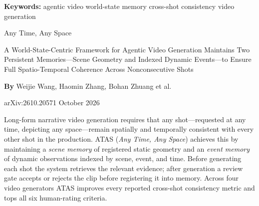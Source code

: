 \documentclass[10pt,twocolumn]{article}
\begin{document}
\setlength{\parindent}{0pt}
\setlength{\parskip}{4pt}

{\small\color{keywordgray}\textbf{Keywords:}
  agentic video \textbullet{}
  world-state memory \textbullet{}
  cross-shot consistency \textbullet{}
  video generation}\par\vspace{4pt}

{\LARGE\bfseries\raggedright
  Any Time, Any Space}\par\vspace{4pt}

{\large\itshape\raggedright
  A World-State-Centric Framework for Agentic Video Generation Maintains
  Two Persistent Memories---Scene Geometry and Indexed Dynamic Events---to
  Ensure Full Spatio-Temporal Coherence Across Nonconsecutive Shots}\par\vspace{6pt}

{\small\textbf{By} Weijie Wang, Haomin Zhang, Bohan Zhuang et al.}\par\vspace{2pt}

{\small\color{keywordgray}arXiv:2610.20571 \textbullet{} October 2026}
\par\vspace{2pt}\noindent{\color{rulered}\rule{\columnwidth}{0.6pt}}\vspace{6pt}

Long-form narrative video generation requires that any shot---requested at any
time, depicting any space---remain spatially and temporally consistent with every
other shot in the production. ATAS (\emph{Any Time, Any Space}) achieves this
by maintaining a \emph{scene memory} of registered static geometry and an
\emph{event memory} of dynamic observations indexed by scene, event, and time.
Before generating each shot the system retrieves the relevant evidence; after
generation a review gate accepts or rejects the clip before registering it into
memory. Across four video generators ATAS improves every reported cross-shot
consistency metric and tops all six human-rating criteria.
\end{document}
